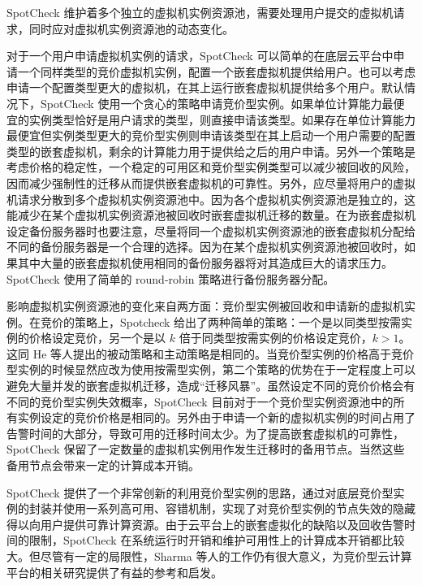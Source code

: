 SpotCheck 维护着多个独立的虚拟机实例资源池，需要处理用户提交的虚拟机请求，同时应对虚拟机实例资源池的动态变化。

对于一个用户申请虚拟机实例的请求，SpotCheck 可以简单的在底层云平台中申请一个同样类型的竞价虚拟机实例，配置一个嵌套虚拟机提供给用户。也可以考虑申请一个配置类型更大的虚拟机，在其上运行嵌套虚拟机提供给多个用户。默认情况下，SpotCheck 使用一个贪心的策略申请竞价型实例。如果单位计算能力最便宜的实例类型恰好是用户请求的类型，则直接申请该类型。如果存在单位计算能力最便宜但实例类型更大的竞价型实例则申请该类型在其上启动一个用户需要的配置类型的嵌套虚拟机，剩余的计算能力用于提供给之后的用户申请。另外一个策略是考虑价格的稳定性，一个稳定的可用区和竞价型实例类型可以减少被回收的风险，因而减少强制性的迁移从而提供嵌套虚拟机的可靠性。另外，应尽量将用户的虚拟机请求分散到多个虚拟机实例资源池中。因为各个虚拟机实例资源池是独立的，这能减少在某个虚拟机实例资源池被回收时嵌套虚拟机迁移的数量。在为嵌套虚拟机设定备份服务器时也要注意，尽量将同一个虚拟机实例资源池的嵌套虚拟机分配给不同的备份服务器是一个合理的选择。因为在某个虚拟机实例资源池被回收时，如果其中大量的嵌套虚拟机使用相同的备份服务器将对其造成巨大的请求压力。SpotCheck 使用了简单的 round-robin 策略进行备份服务器分配。

影响虚拟机实例资源池的变化来自两方面：竞价型实例被回收和申请新的虚拟机实例。在竞价的策略上，Spotcheck 给出了两种简单的策略：一个是以同类型按需实例的价格设定竞价，另一个是以 $k$ 倍于同类型按需实例的价格设定竞价，$k > 1$。这同 He 等人提出的被动策略和主动策略是相同的。当竞价型实例的价格高于竞价型实例的时候显然应改为使用按需型实例，第二个策略的优势在于一定程度上可以避免大量并发的嵌套虚拟机迁移，造成``迁移风暴''。虽然设定不同的竞价价格会有不同的竞价型实例失效概率，SpotCheck 目前对于一个竞价型实例资源池中的所有实例设定的竞价价格是相同的。另外由于申请一个新的虚拟机实例的时间占用了告警时间的大部分，导致可用的迁移时间太少。为了提高嵌套虚拟机的可靠性，SpotCheck 保留了一定数量的虚拟机实例用作发生迁移时的备用节点。当然这些备用节点会带来一定的计算成本开销。

SpotCheck 提供了一个非常创新的利用竞价型实例的思路，通过对底层竞价型实例的封装并使用一系列高可用、容错机制，实现了对竞价型实例的节点失效的隐藏得以向用户提供可靠计算资源。由于云平台上的嵌套虚拟化的缺陷以及回收告警时间的限制，SpotCheck 在系统运行时开销和维护可用性上的计算成本开销都比较大。但尽管有一定的局限性，Sharma 等人的工作仍有很大意义，为竞价型云计算平台的相关研究提供了有益的参考和启发。

